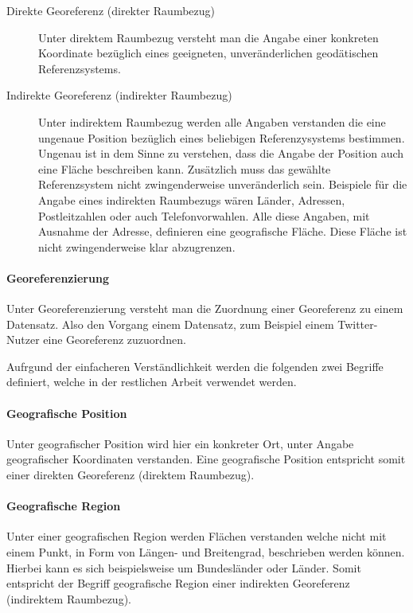 			\begin{description}
	 			\item[Direkte Georeferenz (direkter Raumbezug)] 
	 			Unter direktem Raumbezug versteht man die Angabe einer konkreten Koordinate bezüglich eines geeigneten, unveränderlichen geodätischen Referenzsystems. 
	 			\item[Indirekte Georeferenz (indirekter Raumbezug) ] 
	 			Unter indirektem Raumbezug werden alle Angaben verstanden die eine ungenaue Position bezüglich eines beliebigen Referenzysystems bestimmen.
	 			Ungenau ist in dem Sinne zu verstehen, dass die Angabe der Position auch eine Fläche beschreiben kann.
	 			Zusätzlich muss das gewählte Referenzsystem nicht zwingenderweise unveränderlich sein.   
	 			Beispiele für die Angabe eines indirekten Raumbezugs wären Länder, Adressen, Postleitzahlen oder auch Telefonvorwahlen. 
	 			Alle diese Angaben, mit Ausnahme der Adresse, definieren eine geografische Fläche. 
	 			Diese Fläche ist nicht zwingenderweise klar abzugrenzen.
			\end{description}

	 	\paragraph*{Georeferenzierung}
		Unter Georeferenzierung versteht man die Zuordnung einer Georeferenz zu einem Datensatz. 
		Also den Vorgang einem Datensatz, zum Beispiel einem Twitter-Nutzer eine Georeferenz zuzuordnen.

	 	Aufrgund der einfacheren Verständlichkeit werden die folgenden zwei Begriffe definiert, welche in der restlichen Arbeit verwendet werden.

		\paragraph*{Geografische Position}
		Unter geografischer Position wird hier ein konkreter Ort, unter Angabe geografischer Koordinaten verstanden.
		Eine geografische Position entspricht somit einer direkten Georeferenz (direktem Raumbezug).

		\paragraph*{Geografische Region} 
		Unter einer geografischen Region werden Flächen verstanden welche nicht mit einem Punkt, in Form von Längen- und Breitengrad, beschrieben werden können. 
		Hierbei kann es sich beispielsweise um Bundesländer oder Länder.
		Somit entspricht der Begriff geografische Region einer indirekten Georeferenz (indirektem Raumbezug).

